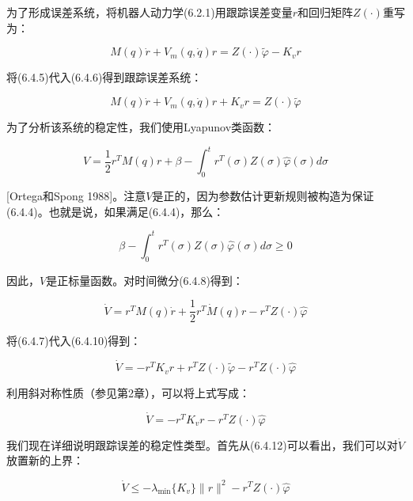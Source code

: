 \documentclass[12pt,a4paper]{ctexart}
\begin{document}
为了形成误差系统，将机器人动力学(6.2.1)用跟踪误差变量$r$和回归矩阵$Z(\cdot)$重写为：

\begin{equation}\label{eq:error-passivity}
M(q)\dot{r} + V_m(q, \dot{q})r = Z(\cdot)\tilde{\varphi} - K_v r
\end{equation}

将(6.4.5)代入(6.4.6)得到跟踪误差系统：

\begin{equation}\label{eq:tracking-error-passivity}
M(q)\dot{r} + V_m(q, \dot{q})r + K_v r = Z(\cdot)\tilde{\varphi}
\end{equation}

为了分析该系统的稳定性，我们使用Lyapunov类函数：

\begin{equation}\label{eq:lyapunov-passivity}
V = \frac{1}{2}r^T M(q) r + \beta - \int_0^t r^T(\sigma)Z(\sigma)\hat{\varphi}(\sigma)d\sigma
\end{equation}

[Ortega和Spong 1988]。注意$V$是正的，因为参数估计更新规则被构造为保证(6.4.4)。也就是说，如果满足(6.4.4)，那么：

\begin{equation}
\beta - \int_0^t r^T(\sigma)Z(\sigma)\hat{\varphi}(\sigma)d\sigma \geq 0
\end{equation}

因此，$V$是正标量函数。对时间微分(6.4.8)得到：

\begin{equation}\label{eq:v-deriv-passivity}
\dot{V} = r^T M(q)\dot{r} + \frac{1}{2}r^T \dot{M}(q)r - r^T Z(\cdot)\hat{\varphi}
\end{equation}

将(6.4.7)代入(6.4.10)得到：

\begin{equation}\label{eq:v-subst-passivity}
\dot{V} = -r^T K_v r + r^T Z(\cdot)\tilde{\varphi} - r^T Z(\cdot)\hat{\varphi}
\end{equation}

利用斜对称性质（参见第2章），可以将上式写成：

\begin{equation}\label{eq:v-skew-passivity}
\dot{V} = -r^T K_v r - r^T Z(\cdot)\hat{\varphi}
\end{equation}

我们现在详细说明跟踪误差的稳定性类型。首先从(6.4.12)可以看出，我们可以对$\dot{V}$放置新的上界：

\begin{equation}
\dot{V} \leq -\lambda_{\min}\{K_v\}\|r\|^2 - r^T Z(\cdot)\hat{\varphi}
\end{equation}
\end{document}
